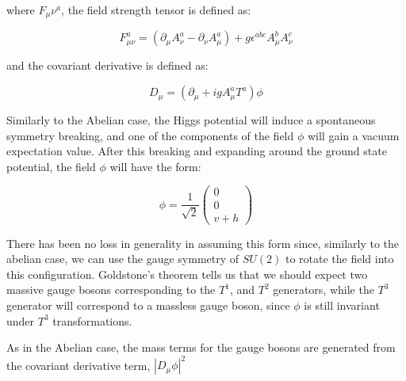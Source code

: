 \noindent where $F_{\mu}{\nu}^{a}$, the field strength tensor is
defined as:

\begin{equation}\label{eq:non_abelian_higgs_mechanism_field_strength_tensor}
F_{\mu\nu}^{a} = (\partial_{\mu}A_{\nu}^{a}
- \partial_{\nu}A_{\mu}^{a}) + g\epsilon^{abc}A_{\mu}^{b}A_{\nu}^{c}
\end{equation}

\noindent and the covariant derivative is defined as:

\begin{equation}\label{eq:non_abelian_higgs_mechanism_covariant_derivative}
D_{\mu} = (\partial_{\mu} + igA_{\mu}^{a}T^{a})\phi
\end{equation}

\par Similarly to the Abelian case, the Higgs potential will induce a
spontaneous symmetry breaking, and one of the components of the field
$\phi$ will gain a vacuum expectation value.  After this breaking and
expanding around the ground state potential, the
field $\phi$ will have the form:

\begin{equation}\label{eq:non_abelian_higgs_mechanism_phi_broken}
\phi = \frac{1}{\sqrt{2}}
  \begin{pmatrix}
    0 \\
    0 \\
    v + h
    \end{pmatrix}
\end{equation}

\noindent There has been no loss in generality in assuming this form
since, similarly to the abelian case, we can use the gauge symmetry of
$SU(2)$ to rotate the field into this configuration.  Goldstone's
theorem tells us that we should expect two massive gauge bosons
corresponding to the $T^{1}$, and $T^{2}$ generators, while the
$T^{3}$ generator will correspond to a massless gauge boson, since
$\phi$ is still invariant under $T^{3}$ transformations. 

\par As in the Abelian case, the mass terms for the gauge bosons are
generated from the covariant derivative term, $|D_{\mu}\phi|^{2}$

